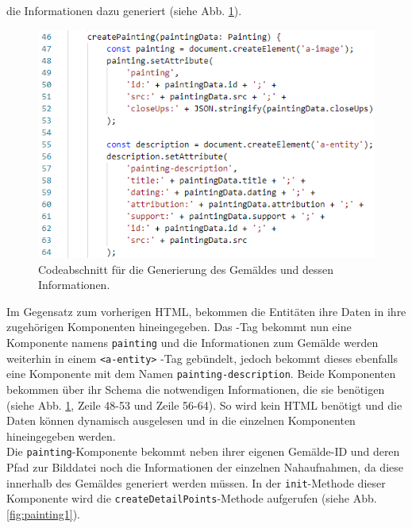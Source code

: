 \documentclass[a4paper,12pt,oneside]{article}
\begin{document}
        die Informationen dazu generiert (siehe Abb. \ref{fig:paintings-builder2}).
        \begin{figure}
          \centering
          \includegraphics{img/coding/paintings-builder2.png}
          \caption{Codeabschnitt für die Generierung des Gemäldes und dessen Informationen.}
          \label{fig:paintings-builder2}
        \end{figure}
        Im Gegensatz zum vorherigen HTML, bekommen die Entitäten ihre Daten
        in ihre zugehörigen Komponenten hineingegeben. Das 
        -Tag bekommt nun eine Komponente namens \texttt{painting} und die 
        Informationen zum Gemälde werden weiterhin in einem \texttt{<a-entity>}
        -Tag gebündelt, jedoch bekommt dieses ebenfalls eine Komponente mit dem
        Namen \texttt{painting-description}. Beide Komponenten bekommen
        über ihr Schema die notwendigen Informationen, die sie benötigen
        (siehe Abb. \ref{fig:paintings-builder2}, Zeile 48-53 und Zeile 56-64).
        So wird kein HTML benötigt und die Daten können dynamisch ausgelesen
        und in die einzelnen Komponenten hineingegeben werden. \\
        Die \texttt{painting}-Komponente bekommt neben ihrer eigenen Gemälde-ID
        und deren Pfad zur Bilddatei noch die Informationen der einzelnen
        Nahaufnahmen, da diese innerhalb des Gemäldes generiert werden müssen.
        In der \texttt{init}-Methode dieser Komponente wird die 
        \texttt{createDetailPoints}-Methode aufgerufen 
        (siehe Abb. \ref{fig:painting1}).
\end{document}
